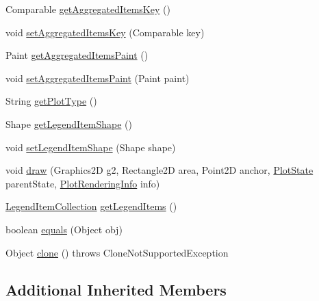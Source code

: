 \begin{DoxyCompactItemize}
\item 
Comparable \mbox{\hyperlink{classorg_1_1jfree_1_1chart_1_1plot_1_1_multiple_pie_plot_ac85a56c2f20afaef62000fdd1b4801d5}{get\+Aggregated\+Items\+Key}} ()
\item 
void \mbox{\hyperlink{classorg_1_1jfree_1_1chart_1_1plot_1_1_multiple_pie_plot_a94593f4380298dac542e1e838a69eabb}{set\+Aggregated\+Items\+Key}} (Comparable key)
\item 
Paint \mbox{\hyperlink{classorg_1_1jfree_1_1chart_1_1plot_1_1_multiple_pie_plot_acef21e3eb141c820d4739c807541326d}{get\+Aggregated\+Items\+Paint}} ()
\item 
void \mbox{\hyperlink{classorg_1_1jfree_1_1chart_1_1plot_1_1_multiple_pie_plot_a45fa376d4023c45b5ecd8ce011fe8dd8}{set\+Aggregated\+Items\+Paint}} (Paint paint)
\item 
String \mbox{\hyperlink{classorg_1_1jfree_1_1chart_1_1plot_1_1_multiple_pie_plot_a04c02f7409690022b8c7764a564fe809}{get\+Plot\+Type}} ()
\item 
Shape \mbox{\hyperlink{classorg_1_1jfree_1_1chart_1_1plot_1_1_multiple_pie_plot_a7b11a3d657b29e8c9cf3cc61c20939d6}{get\+Legend\+Item\+Shape}} ()
\item 
void \mbox{\hyperlink{classorg_1_1jfree_1_1chart_1_1plot_1_1_multiple_pie_plot_ab20492349d20cde1d15d70b665b1a57d}{set\+Legend\+Item\+Shape}} (Shape shape)
\item 
void \mbox{\hyperlink{classorg_1_1jfree_1_1chart_1_1plot_1_1_multiple_pie_plot_a75aa2bbc17f0c7b1d0d388195d870f0d}{draw}} (Graphics2D g2, Rectangle2D area, Point2D anchor, \mbox{\hyperlink{classorg_1_1jfree_1_1chart_1_1plot_1_1_plot_state}{Plot\+State}} parent\+State, \mbox{\hyperlink{classorg_1_1jfree_1_1chart_1_1plot_1_1_plot_rendering_info}{Plot\+Rendering\+Info}} info)
\item 
\mbox{\hyperlink{classorg_1_1jfree_1_1chart_1_1_legend_item_collection}{Legend\+Item\+Collection}} \mbox{\hyperlink{classorg_1_1jfree_1_1chart_1_1plot_1_1_multiple_pie_plot_ac0d250e515644283985aec95f5d639f6}{get\+Legend\+Items}} ()
\item 
boolean \mbox{\hyperlink{classorg_1_1jfree_1_1chart_1_1plot_1_1_multiple_pie_plot_a607dc2e74a9d467990328cc5a4c5a5e6}{equals}} (Object obj)
\item 
Object \mbox{\hyperlink{classorg_1_1jfree_1_1chart_1_1plot_1_1_multiple_pie_plot_a319f0a8902d521bb1c1c92c5e78999ac}{clone}} ()  throws Clone\+Not\+Supported\+Exception 
\end{DoxyCompactItemize}
\subsection*{Additional Inherited Members}


